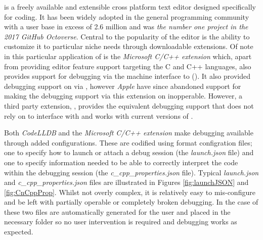  is a freely available and extensible cross platform text editor designed specifically for coding. It has been widely adopted in the general programming
community with a user base in excess of 2.6 million\citep{VCusers} and was \emph{the number one project in the 2017 GitHub Octoverse}. Central to the 
popularity of the editor is the ability to customize it to particular niche needs through downloadable extensions. Of note in this particular application of  
is the \emph{Microsoft C/C++ extension} \citep{VSCodeCCppExt} which, apart from providing editor feature support targeting the C and C++ languages, also provides support for 
debugging via the machine interface to  (). It also provided debugging support on  via , however \emph{Apple} have since abandoned support for  making 
the debugging support via this extension on  inopperable. However, a third party extension, \citep{CodeLLDB}, provides the equivalent debugging support that does not rely on
 to interface with  and works with current versions of . 

Both \emph{CodeLLDB} and the \emph{Microsoft C/C++ extension} make debugging available through added configurations. These are codified using \citep{JSON} format configration files;
one to specify how to launch or attach a debug session (the \emph{launch.json} file) and one to specify information needed to be able to correctly interpret the code within the debugging 
session (the \emph{c\_cpp\_properties.json} file). Typical \emph{launch.json} and \emph{c\_cpp\_properties.json} files are illustrated in Figures \ref{fig:launchJSON} and \ref{fig:CnCppProp}.
Whilst not overly complex, it is relatively easy to mis-configure and be left with partially operable or completely broken debugging. In the case of  these two files are 
automatically generated for the user and placed in the necessary folder so no user intervention is required and debugging works as expected.


